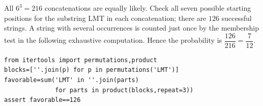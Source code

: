 All $6^3=216$ concatenations are equally likely. Check all seven possible starting positions for the substring LMT in each concatenation; there are $126$ successful strings. A string with several occurrences is counted just once by the membership test in the following exhaustive computation. Hence the probability is $\dfrac{126}{216}=\boxed{\dfrac{7}{12}}$.\begin{verbatim}
from itertools import permutations,product
blocks=[''.join(p) for p in permutations('LMT')]
favorable=sum('LMT' in ''.join(parts)
              for parts in product(blocks,repeat=3))
assert favorable==126
\end{verbatim}
